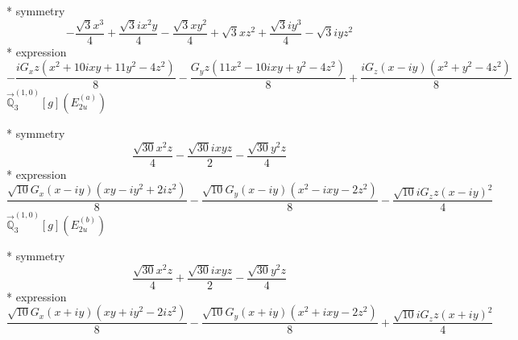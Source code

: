 \documentclass[fleqn,8pt]{jsarticle}
\begin{document}
\noindent\quad ** symmetry
\begin{dmath*}
- \frac{\sqrt{3} x^{3}}{4} + \frac{\sqrt{3} i x^{2} y}{4} - \frac{\sqrt{3} x y^{2}}{4} + \sqrt{3} x z^{2} + \frac{\sqrt{3} i y^{3}}{4} - \sqrt{3} i y z^{2}
\end{dmath*}
\noindent\quad ** expression
\begin{dmath*}
- \frac{i G_{x} z \left(x^{2} + 10 i x y + 11 y^{2} - 4 z^{2}\right)}{8} - \frac{G_{y} z \left(11 x^{2} - 10 i x y + y^{2} - 4 z^{2}\right)}{8} + \frac{i G_{z} \left(x - i y\right) \left(x^{2} + y^{2} - 4 z^{2}\right)}{8}
\end{dmath*}
\noindent\quad $\vec{\mathbb{Q}}_{3}^{(1,0)}[g](E_{2u}^{(a)})$

\noindent\quad ** symmetry
\begin{dmath*}
\frac{\sqrt{30} x^{2} z}{4} - \frac{\sqrt{30} i x y z}{2} - \frac{\sqrt{30} y^{2} z}{4}
\end{dmath*}
\noindent\quad ** expression
\begin{dmath*}
\frac{\sqrt{10} G_{x} \left(x - i y\right) \left(x y - i y^{2} + 2 i z^{2}\right)}{8} - \frac{\sqrt{10} G_{y} \left(x - i y\right) \left(x^{2} - i x y - 2 z^{2}\right)}{8} - \frac{\sqrt{10} i G_{z} z \left(x - i y\right)^{2}}{4}
\end{dmath*}
\noindent\quad $\vec{\mathbb{Q}}_{3}^{(1,0)}[g](E_{2u}^{(b)})$

\noindent\quad ** symmetry
\begin{dmath*}
\frac{\sqrt{30} x^{2} z}{4} + \frac{\sqrt{30} i x y z}{2} - \frac{\sqrt{30} y^{2} z}{4}
\end{dmath*}
\noindent\quad ** expression
\begin{dmath*}
\frac{\sqrt{10} G_{x} \left(x + i y\right) \left(x y + i y^{2} - 2 i z^{2}\right)}{8} - \frac{\sqrt{10} G_{y} \left(x + i y\right) \left(x^{2} + i x y - 2 z^{2}\right)}{8} + \frac{\sqrt{10} i G_{z} z \left(x + i y\right)^{2}}{4}
\end{dmath*}
\end{document}
